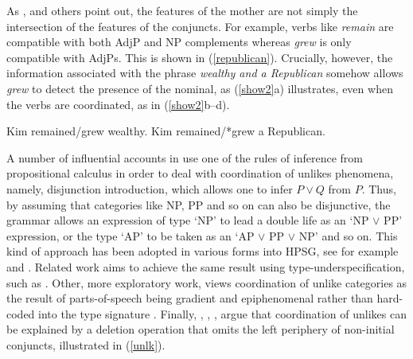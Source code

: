 {
\noindent
As  \citet[417]{jacobson}, \citet{Sag:03} and others point out, the features of the mother are not simply the intersection of the features of the conjuncts. 
For example, verbs like \emph{remain} are compatible with both
AdjP and NP complements whereas \emph{grew}
is only compatible with AdjPs.
This is shown in  (\ref{republican}).
Crucially, however, the information associated with
the phrase \emph{wealthy and a Republican}
somehow allows \emph{grew} to detect the presence of
the nominal, as (\ref{show2}a) illustrates, even
when the verbs
are coordinated, as in (\ref{show2}b--d).


\begin{exe}
\ex
\begin{xlista}
\ex  Kim remained/grew wealthy.
\ex  Kim remained/*grew a Republican.
\end{xlista}\label{republican}
\end{exe}



\begin{exe}
\ex
\begin{xlista}
\end{xlista}\label{show2}
\end{exe}



A number of influential accounts in 
\citep{morrill90,morrill94,bayer}\addpages  use one of the rules of
inference from propositional calculus in order to deal with
coordination of unlikes phenomena, namely, disjunction introduction, which allows  one to infer $P \vee Q$ from  $P$.
Thus, by assuming that categories like NP, PP
and so on can also be disjunctive, the grammar allows an expression
of type `NP' to lead a double life as an `NP $\vee$ PP' expression,
or the type `AP' to be taken as an `AP $\vee$ PP $\vee$ NP' and so
on. This kind of approach has been adopted in various forms into HPSG, see for example \citet{Daniels02} and  \citet{Yatabe:04}.
Related work aims to achieve the same result using type-underspecification, such as 
 \citet{Sag:03}. Other, more exploratory work, views coordination of unlike categories as the result of   parts-of-speech being gradient and  epiphenomenal rather than hard-coded into the type signature  \citep{bookivan}.
 Finally,  
 \citet{berthold0}, \citet{yatabe},  \citet{Beavers},
 \citet{chaves06}  argue that
coordination of unlikes can be explained by
a deletion operation that omits the left periphery of
non-initial conjuncts, illustrated in   (\ref{unlk}).


}
